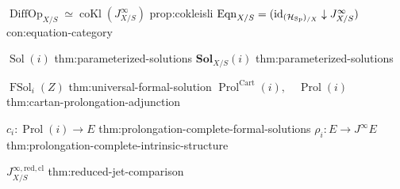 \begin{longtable}

\NotationPair
{\(\operatorname{DiffOp}_{X/S}\simeq
  \operatorname{coKl}(J^\infty_{X/S})\)}
{prop:cokleisli}
{\(\operatorname{Eqn}_{X/S}
  =(\operatorname{id}_{(\mathcal H_{\operatorname{Sp}})_{/X}}\downarrow J^\infty_{X/S})\)}
{con:equation-category}

\NotationPair
{\(\operatorname{Sol}(i)\)}
{thm:parameterized-solutions}
{\(\mathbf{Sol}_{X/S}(i)\)}
{thm:parameterized-solutions}

\NotationPair
{\(\operatorname{FSol}_i(Z)\)}
{thm:universal-formal-solution}
{\(\operatorname{Prol}^{\mathrm{Cart}}(i),\quad
  \operatorname{Prol}(i)\)}
{thm:cartan-prolongation-adjunction}

\NotationPair
{\(c_i:\operatorname{Prol}(i)\to E\)}
{thm:prolongation-complete-formal-solutions}
{\(\rho_i:E\to J^\infty E\)}
{thm:prolongation-complete-intrinsic-structure}

\NotationSingle
{\(J^{\infty,\mathrm{red,cl}}_{X/S}\)}
{thm:reduced-jet-comparison}

\end{longtable}

\endgroup
